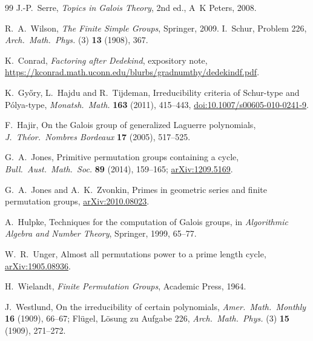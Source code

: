 \documentclass[11pt,a4paper]{amsart}
\theoremstyle{plain}
\theoremstyle{definition}
\begin{document}
\begin{thebibliography}{99}
J.-P.~Serre, \emph{Topics in Galois Theory}, 2nd ed., A~K Peters, 2008.

R.~A.~Wilson, \emph{The Finite Simple Groups}, Springer, 2009.
I.~Schur, Problem 226, \emph{Arch.\ Math.\ Phys.} (3) \textbf{13} (1908), 367.

K.~Conrad, \emph{Factoring after Dedekind}, expository note, \url{https://kconrad.math.uconn.edu/blurbs/gradnumthy/dedekindf.pdf}.

K.~Gy\H{o}ry, L.~Hajdu and R.~Tijdeman, Irreducibility criteria of Schur-type and P\'olya-type, \emph{Monatsh.\ Math.} \textbf{163} (2011), 415--443, \href{https://doi.org/10.1007/s00605-010-0241-9}{doi:10.1007/s00605-010-0241-9}.

F.~Hajir, On the Galois group of generalized Laguerre polynomials, \emph{J.\ Th\'eor.\ Nombres Bordeaux} \textbf{17} (2005), 517--525.

G.~A.~Jones, Primitive permutation groups containing a cycle, \emph{Bull.\ Aust.\ Math.\ Soc.} \textbf{89} (2014), 159--165; \href{https://arxiv.org/abs/1209.5169}{arXiv:1209.5169}.

G.~A.~Jones and A.~K.~Zvonkin, Primes in geometric series and finite permutation groups, \href{https://arxiv.org/abs/2010.08023}{arXiv:2010.08023}.

A.~Hulpke, Techniques for the computation of Galois groups, in \emph{Algorithmic Algebra and Number Theory}, Springer, 1999, 65--77.

W.~R.~Unger, Almost all permutations power to a prime length cycle, \href{https://arxiv.org/abs/1905.08936}{arXiv:1905.08936}.

H.~Wielandt, \emph{Finite Permutation Groups}, Academic Press, 1964.

J.~Westlund, On the irreducibility of certain polynomials, \emph{Amer.\ Math.\ Monthly} \textbf{16} (1909), 66--67; Fl\"ugel, L\"osung zu Aufgabe 226, \emph{Arch.\ Math.\ Phys.} (3) \textbf{15} (1909), 271--272.

\end{thebibliography}
\end{document}
